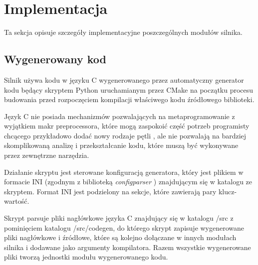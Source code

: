 \section {Implementacja}

Ta sekcja opisuje szczegóły implementacyjne poszczególnych modułów silnika.

\subsection{Wygenerowany kod}

Silnik używa kodu w języku C wygenerowanego przez automatyczny generator kodu będący skryptem Python uruchamianym przez CMake na początku procesu budowania przed rozpoczęciem kompilacji właściwego
kodu źródłowego biblioteki.

Język C nie posiada mechanizmów pozwalających na metaprogramowanie z wyjątkiem makr preprocessora, które mogą zaspokoić część potrzeb programisty chcącego przykładowo dodać nowy rodzaje pętli \cite{METACONTROLC}, ale nie pozwalają na bardziej skomplikowaną analizę i przekształcanie kodu, które muszą być wykonywane przez zewnętrzne narzędzia.

Działanie skryptu jest sterowane konfiguracją generatora, który jest plikiem w formacie INI (zgodnym z biblioteką \textit{configparser} \cite{PYTHONCONFIGPARSER}) znajdującym się w katalogu ze skryptem.
Format INI jest podzielony na sekcje, które zawierają pary klucz-wartość.

Skrypt parsuje pliki nagłówkowe języka C znajdujący się w katalogu /src z
pominięciem katalogu /src/codegen, do którego skrypt zapisuje wygenerowane pliki nagłówkowe i źródłowe, które są kolejno dołączane w innych modułach silnika i dodawane jako argumenty kompilatora.
Razem wszystkie wygenerowane pliki tworzą jednostki modułu wygenerowanego kodu.


